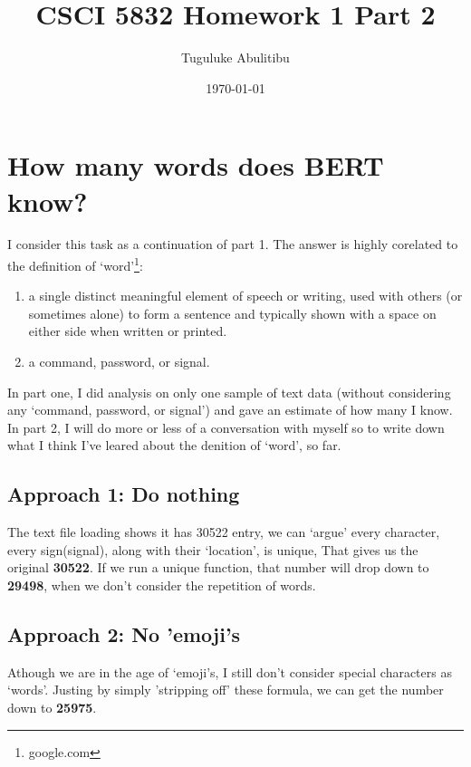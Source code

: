 \documentclass{article}
\title{CSCI 5832  Homework 1 Part 2}
\author{Tuguluke Abulitibu}
\date{\today}
\begin{document}
	\maketitle %
	\section*{How many words does BERT know?}	

I consider this task as a continuation of part 1. The answer is highly corelated to the definition of `word'\footnote{google.com}:
	\begin{enumerate}
		\item 	a single distinct meaningful element of speech or writing, used with others (or sometimes alone) to form a sentence and typically shown with a space on either side when written or printed.
		\item a command, password, or signal.
		
	\end{enumerate}
In part one, I did analysis on only one sample of text data (without considering any `command, password, or signal') and gave an estimate of how  many I know. In part 2, I will do more or less of a conversation with myself so to write down what I think I've leared about the denition of `word', so far.\\
	\subsection*{Approach 1: Do nothing}
	The text file loading shows it has 30522 entry, we can `argue' every character, every sign(signal), along with their `location', is unique, That gives us the original \textbf{30522}. If we run a unique function, that number will drop down to  \textbf{29498}, when we don't consider the repetition of words. 
	
		\subsection*{Approach 2: No 'emoji's}
Athough we are in  the age of `emoji's, I still don't consider special characters as `words'.  Justing by simply 'stripping off' these formula, we can get the number down to \textbf{25975}.  
	
\end{document}
